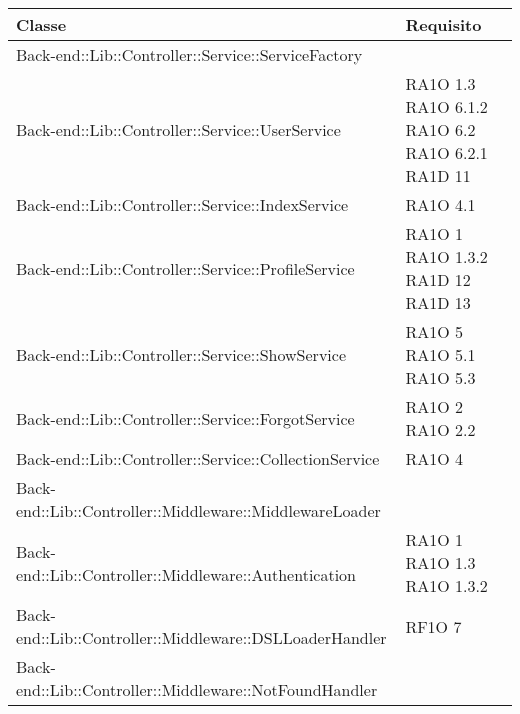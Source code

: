 \begin{center}
      \bgroup
      \def\arraystretch{1.8}
      \begin{longtable}{ | p{11cm} | p{3cm} | }
    \hline
    
      \cellcolor[gray]{0.9} \textbf{Classe} & \cellcolor[gray]{0.9} \textbf{Requisito} \\ \hline
    Back-end::Lib::Controller::Service::ServiceFactory & \\ \hline
	Back-end::Lib::Controller::Service::UserService & RA1O 1.3 \newline RA1O 6.1.2 \newline RA1O 6.2 \newline RA1O 6.2.1  \newline 
	RA1D 11  \\ \hline
	
	Back-end::Lib::Controller::Service::IndexService & RA1O 4.1 \\ \hline
	
	Back-end::Lib::Controller::Service::ProfileService & RA1O 1 \newline RA1O 1.3.2  \newline RA1D 12 \newline RA1D 13 \\ \hline

	Back-end::Lib::Controller::Service::ShowService & RA1O 5 \newline RA1O 5.1 \newline RA1O 5.3 \\ \hline
	
	Back-end::Lib::Controller::Service::ForgotService & RA1O 2 \newline RA1O 2.2 \\ \hline
	
	Back-end::Lib::Controller::Service::CollectionService & RA1O 4 \\ \hline
	
	Back-end::Lib::Controller::Middleware::MiddlewareLoader & \\ \hline

	Back-end::Lib::Controller::Middleware::Authentication & RA1O 1 \newline RA1O 1.3 \newline RA1O 1.3.2 \\ \hline
	
	Back-end::Lib::Controller::Middleware::DSLLoaderHandler & RF1O 7 \\ \hline
	
	Back-end::Lib::Controller::Middleware::NotFoundHandler & \\ \hline
	

\end{longtable}
\end{center}
